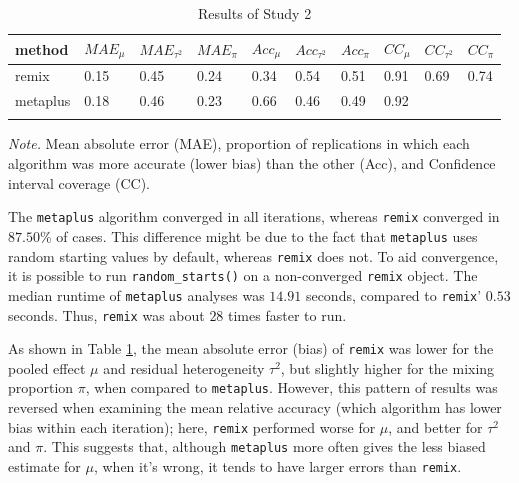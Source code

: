 \documentclass[
  english,
  man, noextraspace,floatsintext]{apa6}
\begin{document}
\begin{table}[tbp]

\begin{center}
\begin{threeparttable}

\caption{\label{tab:tabmetaplus}Results of Study 2}

\begin{tabular}{llllllllll}
\toprule
method & \multicolumn{1}{c}{$MAE_{\mu}$} & \multicolumn{1}{c}{$MAE_{\tau^2}$} & \multicolumn{1}{c}{$MAE_{\pi}$} & \multicolumn{1}{c}{$Acc_{\mu}$} & \multicolumn{1}{c}{$Acc_{\tau^2}$} & \multicolumn{1}{c}{$Acc_{\pi}$} & \multicolumn{1}{c}{$CC_{\mu}$} & \multicolumn{1}{c}{$CC_{\tau^2}$} & \multicolumn{1}{c}{$CC_{\pi}$}\\
\midrule
remix & 0.15 & 0.45 & 0.24 & 0.34 & 0.54 & 0.51 & 0.91 & 0.69 & 0.74\\
metaplus & 0.18 & 0.46 & 0.23 & 0.66 & 0.46 & 0.49 & 0.92 &  & \\
\bottomrule
\addlinespace
\end{tabular}

\begin{tablenotes}[para]
\normalsize{\textit{Note.} Mean absolute error (MAE), proportion of replications in which each algorithm was more accurate (lower bias) than the other (Acc), and Confidence interval coverage (CC).}
\end{tablenotes}

\end{threeparttable}
\end{center}

\end{table}

The \texttt{metaplus} algorithm converged in all iterations, whereas \texttt{remix} converged in \(87.50\)\% of cases.
This difference might be due to the fact that \texttt{metaplus} uses random starting values by default, whereas \texttt{remix} does not.
To aid convergence, it is possible to run \texttt{random\_starts()} on a non-converged \texttt{remix} object.
The median runtime of \texttt{metaplus} analyses was \(14.91\) seconds, compared to \texttt{remix}' \(0.53\) seconds.
Thus, \texttt{remix} was about \(28\) times faster to run.

As shown in Table \ref{tab:tabmetaplus}, the mean absolute error (bias) of \texttt{remix} was lower for the pooled effect \(\mu\) and residual heterogeneity \(\tau^2\), but slightly higher for the mixing proportion \(\pi\), when compared to \texttt{metaplus}.
However, this pattern of results was reversed when examining the mean relative accuracy (which algorithm has lower bias within each iteration);
here, \texttt{remix} performed worse for \(\mu\), and better for \(\tau^2\) and \(\pi\).
This suggests that, although \texttt{metaplus} more often gives the less biased estimate for \(\mu\), when it's wrong, it tends to have larger errors than \texttt{remix}.
\end{document}
